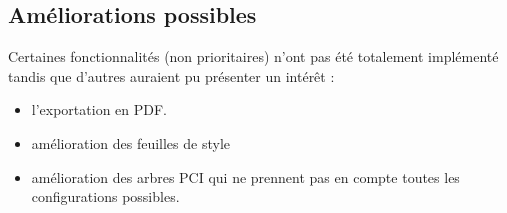 \documentclass [a4paper,11pt]{article}
\begin{document}
\subsection{Améliorations possibles}
Certaines fonctionnalités (non prioritaires) n'ont pas été totalement implémenté tandis que d'autres auraient pu présenter un intérêt : \newline

\begin{itemize}
\item l'exportation en PDF.
\item amélioration des feuilles de style
\item amélioration des arbres PCI qui ne prennent pas en compte toutes les configurations possibles.
\end{itemize}

\newpage



\end{document}
